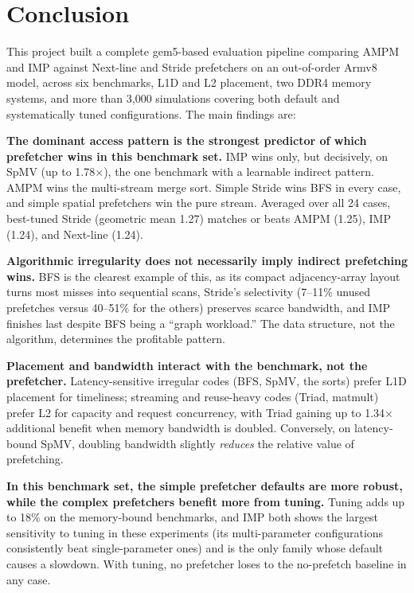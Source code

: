 \documentclass[12pt, letterpaper]{article}
\begin{document}
\FloatBarrier
\section{Conclusion}
\label{sec:conc}

This project built a complete gem5-based evaluation pipeline comparing AMPM and IMP against Next-line and Stride prefetchers on an out-of-order Armv8 model, across six benchmarks, L1D and L2 placement, two DDR4 memory systems, and more than 3{,}000 simulations covering both default and systematically tuned configurations. The main findings are:

\noindent\textbf{The dominant access pattern is the strongest predictor of which prefetcher wins in this benchmark set.} IMP wins only, but decisively, on SpMV (up to 1.78$\times$), the one benchmark with a learnable indirect pattern. AMPM wins the multi-stream merge sort. Simple Stride wins BFS in every case, and simple spatial prefetchers win the pure stream. Averaged over all 24 cases, best-tuned Stride (geometric mean 1.27) matches or beats AMPM (1.25), IMP (1.24), and Next-line (1.24).

\noindent\textbf{Algorithmic irregularity does not necessarily imply indirect prefetching wins.} BFS is the clearest example of this, as its compact adjacency-array layout turns most misses into sequential scans, Stride's selectivity (7--11\% unused prefetches versus 40--51\% for the others) preserves scarce bandwidth, and IMP finishes last despite BFS being a ``graph workload.'' The data structure, not the algorithm, determines the profitable pattern.

\noindent\textbf{Placement and bandwidth interact with the benchmark, not the prefetcher.} Latency-sensitive irregular codes (BFS, SpMV, the sorts) prefer L1D placement for timeliness; streaming and reuse-heavy codes (Triad, matmult) prefer L2 for capacity and request concurrency, with Triad gaining up to 1.34$\times$ additional benefit when memory bandwidth is doubled. Conversely, on latency-bound SpMV, doubling bandwidth slightly \emph{reduces} the relative value of prefetching.

\noindent\textbf{In this benchmark set, the simple prefetcher defaults are more robust, while the complex prefetchers benefit more from tuning.} Tuning adds up to 18\% on the memory-bound benchmarks, and IMP both shows the largest sensitivity to tuning in these experiments (its multi-parameter configurations consistently beat single-parameter ones) and is the only family whose default causes a slowdown. With tuning, no prefetcher loses to the no-prefetch baseline in any case.
\end{document}
